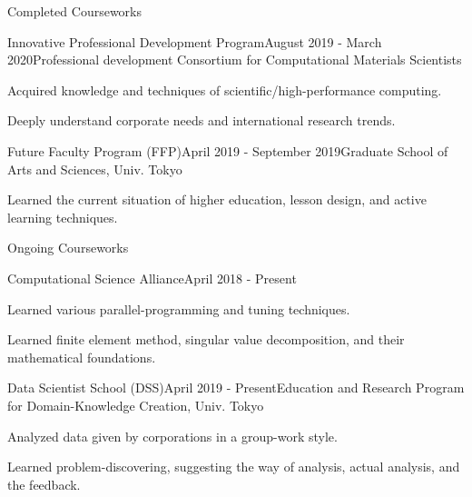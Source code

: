 \documentclass{resume} %
\begin{document}
\newpage

\begin{rSection}{Completed Courseworks}

\begin{rSubsection}{Innovative Professional Development Program}{August 2019 - March 2020}{Professional development Consortium for Computational Materials Scientists}{}
\item Acquired knowledge and techniques of scientific/high-performance computing.
\item Deeply understand corporate needs and international research trends.
\end{rSubsection}

\begin{rSubsection}{Future Faculty Program (FFP)}{April 2019 - September 2019}{Graduate School of Arts and Sciences, Univ. Tokyo}{}
\item Learned the current situation of higher education, lesson design, and active learning techniques.
\end{rSubsection}

\end{rSection}

\begin{rSection}{Ongoing Courseworks}

\begin{rSubsection}{Computational Science Alliance}{April 2018 - Present}{}{}
\item Learned various parallel-programming and tuning techniques.
\item Learned finite element method, singular value decomposition, and their mathematical foundations.
\end{rSubsection}

\begin{rSubsection}{Data Scientist School (DSS)}{April 2019 - Present}{Education and Research Program for Domain-Knowledge Creation, Univ. Tokyo}{}
\item Analyzed data given by corporations in a group-work style.
\item Learned problem-discovering, suggesting the way of analysis, actual analysis, and the feedback.
\end{rSubsection}

\end{rSection}
\end{document}
